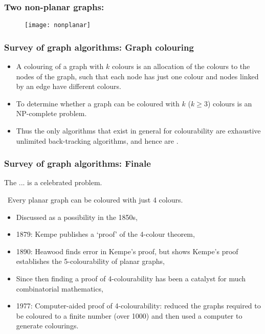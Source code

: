   \begin{frame}[fragile]
\frametitle{Two non-planar graphs:}

    \begin{figure} [ht]
    \centering
    \texttt{[image: nonplanar]}
    \end{figure}


\end{frame}

  \begin{frame}[fragile]\frametitle{Survey of graph algorithms: Graph colouring}

\begin{itemize}
\item A \alert{colouring} of a graph with $k$ colours is an allocation of the colours to the nodes of the graph, such that each node has just one colour and nodes linked by an edge have different colours.

\item To determine whether a graph can be coloured with $k$ ($k\ge 3$) colours is 
an \alert{NP-complete problem}.

\item Thus the only algorithms that exist in general for colourability are exhaustive 
unlimited back-tracking algorithms, and hence are \color{blue}{exponential-time}\color{black}.
\end{itemize}
\end{frame}


  \begin{frame}[fragile]
\frametitle{Survey of graph algorithms: Finale}


The \color{blue}{4-colouring of planar graphs}\color{black}... is a \alert{celebrated problem}.

\color{blue}{\bf Proposition}\color{black}\ Every planar graph can be coloured with just 4 colours. 

\begin{itemize}
\item Discussed as a possibility in the 1850s,
\item 1879: Kempe publishes a `proof' of the 4-colour theorem,
\item 1890: Heawood finds error in Kempe's proof, but shows Kempe's proof establishes the 5-colourability of planar graphs,
\item Since then finding a proof of 4-colourability has been a catalyst for much combinatorial mathematics,
\item 1977: Computer-aided proof of 4-colourability: reduced the graphs required to be coloured to a finite number (over 1000) and then used a computer to generate colourings.
\end{itemize}
\end{frame}


